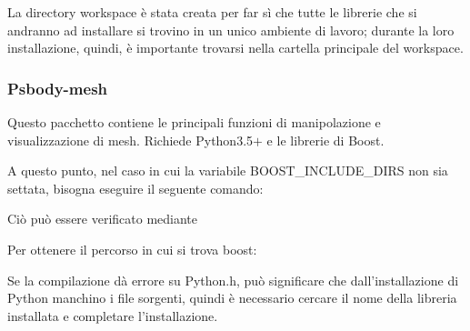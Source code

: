 \medskip

La directory workspace è stata creata per far sì che tutte le librerie che si andranno ad installare si trovino in un unico ambiente di lavoro; durante la loro installazione, quindi, è importante trovarsi nella cartella principale del workspace.


\medskip

\subsubsection{Psbody-mesh}

Questo pacchetto contiene le principali funzioni di manipolazione e visualizzazione di mesh. Richiede Python3.5$+$ e le librerie di Boost.

\medskip







\medskip
A questo punto, nel caso in cui la variabile BOOST\_INCLUDE\_DIRS non sia settata, 
bisogna eseguire il seguente comando: 





\medskip

Ciò può essere verificato mediante 

\medskip






\medskip\medskip\medskip

Per ottenere il percorso in cui si trova boost:







\medskip

Se la compilazione dà errore su Python.h, può significare che dall’installazione di Python manchino i file sorgenti, quindi è necessario cercare il nome della libreria installata e completare l’installazione.

\medskip

